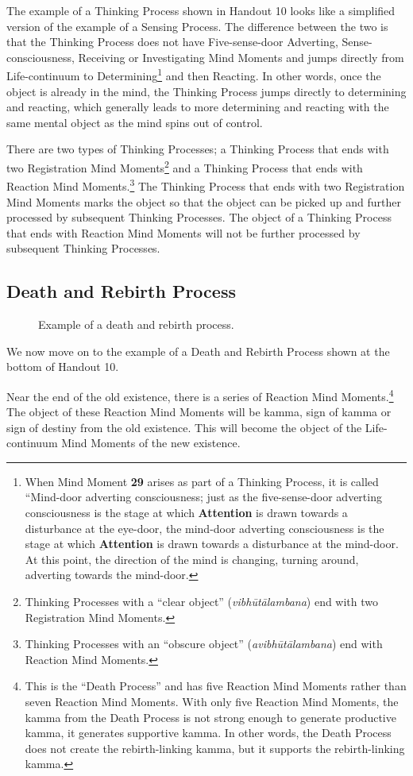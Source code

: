 The example of a Thinking Process shown in Handout 10 looks like a simplified version of the example of a Sensing Process. The difference between the two is that the Thinking Process does not have Five-sense-door Adverting, Sense-consciousness, Receiving or Investigating Mind Moments and jumps directly from Life-continuum to Determining\footnote{When Mind Moment \textbf{29} arises as part of a Thinking Process, it is called “Mind-door adverting consciousness; just as the five-sense-door adverting consciousness is the stage at which \textbf{Attention} is drawn towards a disturbance at the eye-door, the mind-door adverting consciousness is the stage at which \textbf{Attention} is drawn towards a disturbance at the mind-door. At this point, the direction of the mind is changing, turning around, adverting towards the mind-door.} and then Reacting. In other words, once the object is already in the mind, the Thinking Process jumps directly to determining and reacting, which generally leads to more determining and reacting with the same mental object as the mind spins out of control.

There are two types of Thinking Processes; a Thinking Process that ends with two Registration Mind Moments\footnote{Thinking Processes with a “clear object” (\textit{vibhūtālambana}) end with two Registration Mind Moments.} and a Thinking Process that ends with Reaction Mind Moments.\footnote{Thinking Processes with an “obscure object” (\textit{avibhūtālambana}) end with Reaction Mind Moments.} The Thinking Process that ends with two Registration Mind Moments marks the object so that the object can be picked up and further processed by subsequent Thinking Processes. The object of a Thinking Process that ends with Reaction Mind Moments will not be further processed by subsequent Thinking Processes.

\subsection*{Death and Rebirth Process}

\begin{figure}[h]
\centering

\caption{Example of a death and rebirth process.}
\label{fig:Death}
\end{figure}

We now move on to the example of a Death and Rebirth Process shown at the bottom of Handout 10. 

Near the end of the old existence, there is a series of Reaction Mind Moments.\footnote{This is the “Death Process” and has five Reaction Mind Moments rather than seven Reaction Mind Moments. With only five Reaction Mind Moments, the kamma from the Death Process is not strong enough to generate productive kamma, it generates supportive kamma. In other words, the Death Process does not create the rebirth-linking kamma, but it supports the rebirth-linking kamma.} The object of these Reaction Mind Moments will be kamma, sign of kamma or sign of destiny from the old existence. This will become the object of the Life-continuum Mind Moments of the new existence. 

